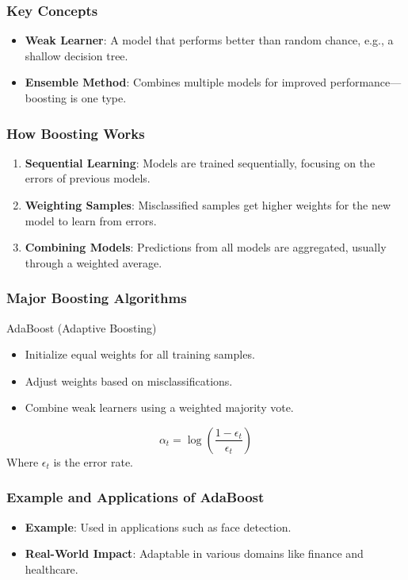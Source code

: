 \documentclass[aspectratio=169]{beamer}
\begin{document}
\begin{frame}[fragile]
    \frametitle{Key Concepts}
    \begin{itemize}
        \item \textbf{Weak Learner}: A model that performs better than random chance, e.g., a shallow decision tree.
        \item \textbf{Ensemble Method}: Combines multiple models for improved performance—boosting is one type.
    \end{itemize}
\end{frame}

\begin{frame}[fragile]
    \frametitle{How Boosting Works}
    \begin{enumerate}
        \item \textbf{Sequential Learning}: Models are trained sequentially, focusing on the errors of previous models.
        \item \textbf{Weighting Samples}: Misclassified samples get higher weights for the new model to learn from errors.
        \item \textbf{Combining Models}: Predictions from all models are aggregated, usually through a weighted average.
    \end{enumerate}
\end{frame}

\begin{frame}[fragile]
    \frametitle{Major Boosting Algorithms}
    \begin{block}{AdaBoost (Adaptive Boosting)}
        \begin{itemize}
            \item Initialize equal weights for all training samples.
            \item Adjust weights based on misclassifications.
            \item Combine weak learners using a weighted majority vote.
        \end{itemize}
        \begin{equation}
            \alpha_t = \log\left(\frac{1 - \epsilon_t}{\epsilon_t}\right)
        \end{equation}
        Where \( \epsilon_t \) is the error rate.
    \end{block}
\end{frame}

\begin{frame}[fragile]
    \frametitle{Example and Applications of AdaBoost}
    \begin{itemize}
        \item \textbf{Example}: Used in applications such as face detection.
        \item \textbf{Real-World Impact}: Adaptable in various domains like finance and healthcare.
    \end{itemize}
\end{frame}
\end{document}
